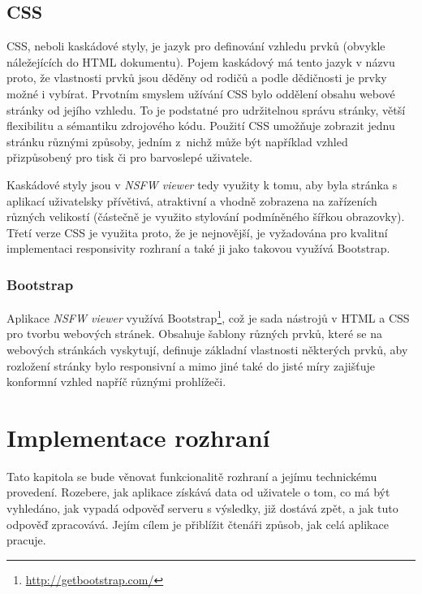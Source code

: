 \documentclass[a4paper, 11pt, oneside]{book}
\newcommand{\simplywn}{\textit{NSFW viewer} }
\begin{document}
			\section{CSS}

				CSS, neboli kaskádové styly, je jazyk pro definování vzhledu prvků (obvykle náležejících do HTML dokumentu). Pojem kaskádový má tento jazyk v názvu proto, že vlastnosti prvků jsou děděny od rodičů a podle dědičnosti je prvky možné i vybírat. Prvotním smyslem užívání CSS bylo oddělení obsahu webové stránky od jejího vzhledu. To je podstatné pro udržitelnou správu stránky, větší flexibilitu a sémantiku zdrojového kódu. Použití CSS umožňuje zobrazit jednu stránku různými způsoby, jedním z~nichž může být například vzhled přizpůsobený pro tisk či pro barvoslepé uživatele.

				Kaskádové styly jsou v \simplywn tedy využity k tomu, aby byla stránka s aplikací uživatelsky přívětivá, atraktivní a vhodně zobrazena na zařízeních různých velikostí (částečně je využito stylování podmíněného šířkou obrazovky). Třetí verze CSS je využita proto, že je nejnovější, je vyžadována pro kvalitní implementaci responsivity rozhraní a také ji jako takovou využívá Bootstrap. 

				\subsection{Bootstrap}

					Aplikace \simplywn využívá Bootstrap\footnote{\url{http://getbootstrap.com/}}, což je sada nástrojů v HTML a CSS pro tvorbu webových stránek. Obsahuje šablony různých prvků, které se na webových stránkách vyskytují, definuje základní vlastnosti některých prvků, aby rozložení stránky bylo responsivní a mimo jiné také do jisté míry zajišťuje konformní vzhled napříč různými prohlížeči.

		\chapter{Implementace rozhraní}

			Tato kapitola se bude věnovat funkcionalitě rozhraní a jejímu technickému provedení. Rozebere, jak aplikace získává data od uživatele o tom, co má být vyhledáno, jak vypadá odpověď serveru s výsledky, již dostává zpět, a jak tuto odpověď zpracovává. Jejím cílem je přiblížit čtenáři způsob, jak celá aplikace pracuje.
\end{document}
